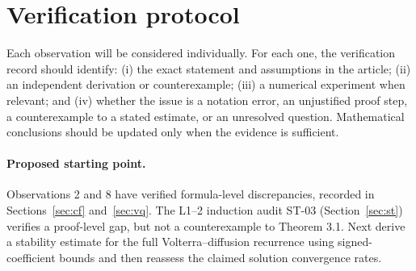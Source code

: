 \documentclass[11pt]{amsart}
\numberwithin{equation}{section}
\theoremstyle{remark}
\begin{document}
\section{Verification protocol}
Each observation will be considered individually. For each one, the
verification record should identify: (i) the exact statement and assumptions
in the article; (ii) an independent derivation or counterexample; (iii) a
numerical experiment when relevant; and (iv) whether the issue is a notation
error, an unjustified proof step, a counterexample to a stated estimate, or
an unresolved question. Mathematical conclusions should be updated only
when the evidence is sufficient.

\paragraph{Proposed starting point.}
Observations 2 and 8 have verified formula-level discrepancies, recorded in
Sections~\ref{sec:cf} and~\ref{sec:vq}. The L1--2 induction audit ST-03
(Section~\ref{sec:st}) verifies a proof-level gap, but not a counterexample
to Theorem 3.1. Next derive a stability estimate for the full
Volterra--diffusion recurrence using signed-coefficient bounds and then
reassess the claimed solution convergence rates.
\end{document}
